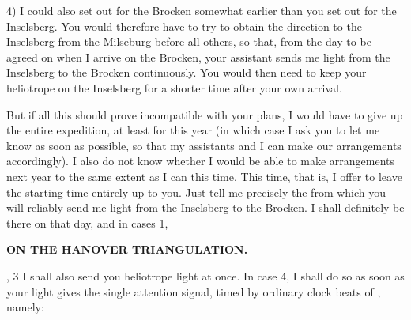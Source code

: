 \par\noindent\hspace*{\parindent}4) I could also set out for the Brocken somewhat earlier than you set out for the Inselsberg. You would therefore have to try to obtain the direction to the Inselsberg from the Milseburg before all others, so that, from the day to be agreed on when I arrive on the Brocken, your assistant sends me light from the Inselsberg to the Brocken continuously.
You would then need to keep your heliotrope on the Inselsberg for a shorter time after your own arrival.
\par\noindent\hspace*{\parindent}But if all this should prove incompatible with your plans, I would have to give up the entire expedition, at least for this year (in which case I ask you to let me know as soon as possible, so that my assistants and I can make our arrangements accordingly). I also do not know whether I would be able to make arrangements next year to the same extent as I can this time.
This time, that is, I offer to leave the starting time entirely up to you.
Just tell me precisely the  from which you will reliably send me light from the Inselsberg to the Brocken.
I shall definitely be there on that day, and in cases 1,
\par\clearpage
\noindent\null\hfill{\small\textbf{ON THE HANOVER TRIANGULATION.}}\hfill{}\par\medskip
{}, 3 I shall also send you heliotrope light at once. In case 4, I shall do so as soon as your light gives the single attention signal, timed by ordinary clock beats of , namely:
\par\smallskip
{\centering
{}\par}
